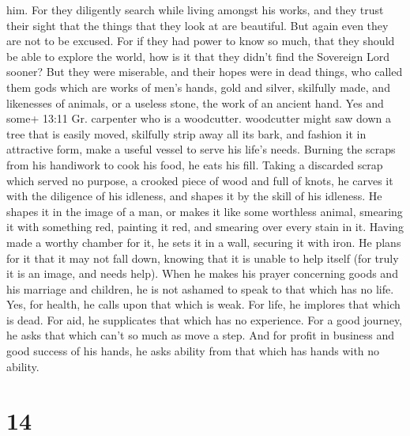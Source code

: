 him.  For they diligently search while living amongst his
works, and they trust their sight that the things that they look at are
beautiful.  But again even they are not to be excused.
 For if they had power to know so much, that they should be
able to explore the world, how is it that they didn't find the Sovereign
Lord sooner?  But they were miserable, and their hopes were
in dead things, who called them gods which are works of men's hands,
gold and silver, skilfully made, and likenesses of animals, or a useless
stone, the work of an ancient hand.  Yes and some+ 13:11
Gr. carpenter who is a woodcutter. woodcutter might saw down a tree that
is easily moved, skilfully strip away all its bark, and fashion it in
attractive form, make a useful vessel to serve his life's needs.
 Burning the scraps from his handiwork to cook his food, he
eats his fill.  Taking a discarded scrap which served no
purpose, a crooked piece of wood and full of knots, he carves it with
the diligence of his idleness, and shapes it by the skill of his
idleness. He shapes it in the image of a man,  or makes it
like some worthless animal, smearing it with something red, painting it
red, and smearing over every stain in it.  Having made a
worthy chamber for it, he sets it in a wall, securing it with iron.
 He plans for it that it may not fall down, knowing that it
is unable to help itself (for truly it is an image, and needs help).
 When he makes his prayer concerning goods and his marriage
and children, he is not ashamed to speak to that which has no life.
 Yes, for health, he calls upon that which is weak. For
life, he implores that which is dead. For aid, he supplicates that which
has no experience. For a good journey, he asks that which can't so much
as move a step.  And for profit in business and good
success of his hands, he asks ability from that which has hands with no
ability.

\hypertarget{section-9}{%
\section{14}\label{section-9}}


